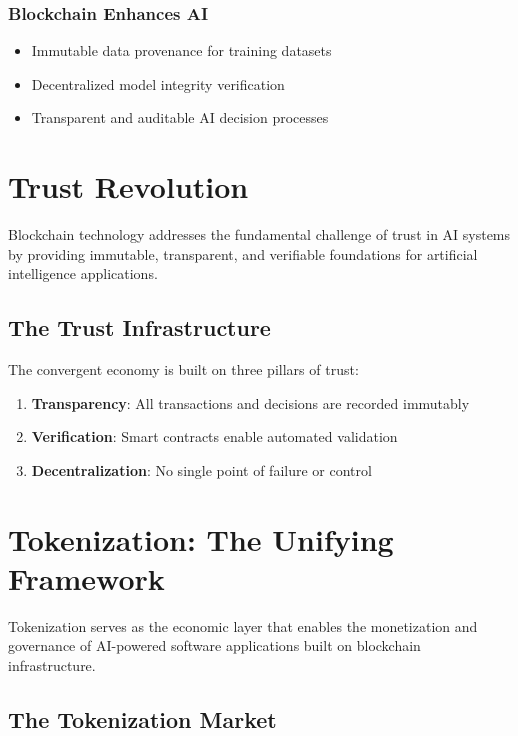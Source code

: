 \documentclass[11pt,a4paper]{report}
\begin{document}
\subsection{Blockchain Enhances AI}
\begin{itemize}
\item Immutable data provenance for training datasets
\item Decentralized model integrity verification
\item Transparent and auditable AI decision processes
\end{itemize}

\chapter{Trust Revolution}

Blockchain technology addresses the fundamental challenge of trust in AI systems by providing immutable, transparent, and verifiable foundations for artificial intelligence applications.

\section{The Trust Infrastructure}

The convergent economy is built on three pillars of trust:

\begin{enumerate}
\item \textbf{Transparency}: All transactions and decisions are recorded immutably
\item \textbf{Verification}: Smart contracts enable automated validation
\item \textbf{Decentralization}: No single point of failure or control
\end{enumerate}

\chapter{Tokenization: The Unifying Framework}

Tokenization serves as the economic layer that enables the monetization and governance of AI-powered software applications built on blockchain infrastructure.

\section{The Tokenization Market}
\end{document}
